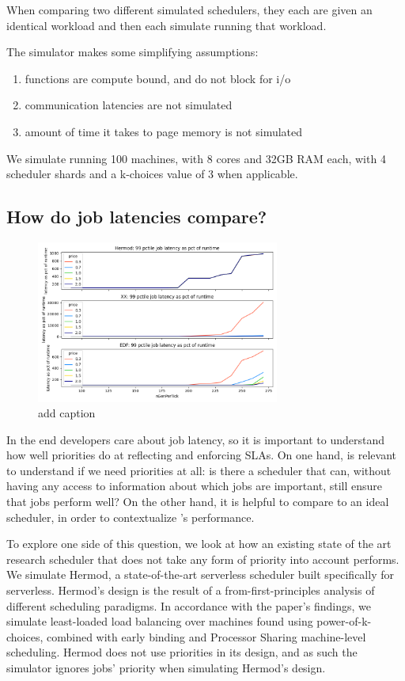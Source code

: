 When comparing two different simulated schedulers, they each are given an
identical workload and then each simulate running that workload.

The simulator makes some simplifying assumptions:
\begin{enumerate}
    \item functions are compute bound, and do not block for i/o
    \item communication latencies are not simulated
    \item amount of time it takes to page memory is not simulated
\end{enumerate}

We simulate running 100 machines, with 8 cores and 32GB RAM each, with 4
scheduler shards and a k-choices value of 3 when applicable.

\subsection{How do job latencies compare?}

\begin{figure}[t!]
    \centering
      \includegraphics[width=8cm]{img/hermod_xx_edf_latency.png}
      \caption{ add caption }
    \label{fig:hermod-xx-edf}
\end{figure}

In the end developers care about job latency, so it is important to understand
how well priorities do at reflecting and enforcing SLAs. On one hand, is
relevant to understand if we need priorities at all: is there a scheduler that
can, without having any access to information about which jobs are important,
still ensure that jobs perform well? On the other hand, it is helpful to compare
\sys{} to an ideal scheduler, in order to contextualize \sys{}'s performance.

To explore one side of this question, we look at how an existing state of the
art research scheduler that does not take any form of priority into account
performs. We simulate Hermod\cite{TODO}, a state-of-the-art serverless scheduler
built specifically for serverless. Hermod's design is the result of a
from-first-principles analysis of different scheduling paradigms. In accordance
with the paper's findings, we simulate least-loaded load balancing over machines
found using power-of-k-choices, combined with early binding and Processor
Sharing machine-level scheduling. Hermod does not use priorities in its design,
and as such the simulator ignores jobs' priority when simulating Hermod's
design.


